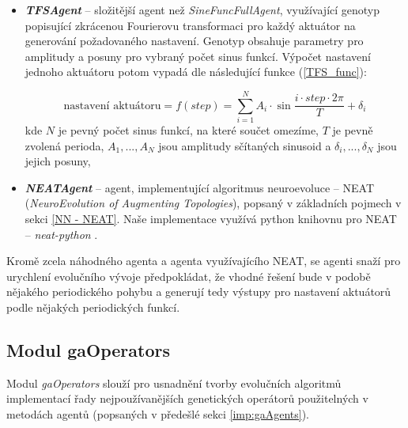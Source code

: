 \begin{itemize}
    \item \textbf{\emph{TFSAgent}} -- složitější agent než \emph{SineFuncFullAgent},
        využívající genotyp popisující zkrácenou Fourierovu transformaci pro
        každý aktuátor na generování požadovaného nastavení. Genotyp obsahuje
        parametry pro amplitudy a posuny pro vybraný počet sinus funkcí.
        Výpočet nastavení jednoho aktuátoru potom vypadá dle následující
        funkce (\ref{TFS_func}):

        \begin{equation}
            \text{nastavení aktuátoru} = f(step) = \sum_{i=1}^{N}A_i\cdot\sin\frac{i\cdot
            step\cdot2\pi}{T} + \delta_i
            \label{TFS_func}
        \end{equation}
        kde $N$ je pevný počet sinus funkcí, na které součet omezíme, $T$ je
        pevně zvolená perioda, $A_1,...,A_N$ jsou amplitudy sčítaných
        sinusoid a $\delta_i,...,\delta_N$ jsou jejich posuny,
    \item \textbf{\emph{NEATAgent}} -- agent, implementující algoritmus
        neuroevoluce -- NEAT (\emph{NeuroEvolution of Augmenting Topologies}),
        popsaný v základních pojmech v sekci \ref{NN - NEAT}. Naše implementace
        využívá python knihovnu pro NEAT -- \emph{neat-python}
        \citep{McIntyre_neat-python}.
\end{itemize}

Kromě zcela náhodného agenta a agenta využívajícího NEAT, se agenti snaží pro
urychlení evolučního vývoje předpokládat, že vhodné řešení bude v podobě
nějakého periodického pohybu a generují tedy výstupy pro nastavení aktuátorů
podle nějakých periodických funkcí. 

\subsection{Modul gaOperators} \label{imp:gaOperators}
Modul \emph{gaOperators} slouží pro usnadnění tvorby evolučních algoritmů
implementací řady nejpoužívanějších genetických operátorů použitelných v
metodách agentů (popsaných v předešlé sekci \ref{imp:gaAgents}). 

